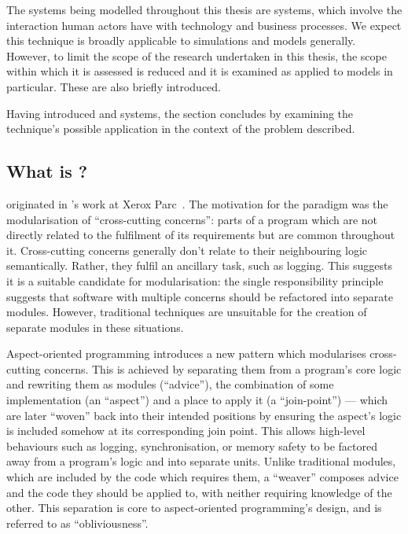 The systems being modelled throughout this thesis are \sociotechnical systems,
which involve the interaction human actors have with technology and business
processes. We expect this technique is broadly applicable to simulations and
models generally. However, to limit the scope of the research undertaken in this
thesis, the scope within which it is assessed is reduced and it is examined as
applied to \sociotechnical models in particular. These are also briefly
introduced.

Having introduced \aop{} and \sociotechnical systems, the
section concludes by examining the technique's possible application in the
context of the problem described.





\subsection{What is \AOP{}?}

\Aop{} originated in \citeauthor{kiczales1997aspect}'s work
at Xerox Parc~\cite{kiczales1997aspect}. The motivation for the paradigm was the
modularisation of ``cross-cutting concerns'': parts of a program which are not
directly related to the fulfilment of its requirements but are common throughout
it. Cross-cutting concerns generally don't relate to their neighbouring logic
semantically. Rather, they fulfil an ancillary task, such as logging. This
suggests it is a suitable candidate for modularisation: the single
responsibility principle~\cite{martin2003singleresponsibility} suggests that
software with multiple concerns should be refactored into separate modules.
However, traditional techniques are unsuitable for the creation of separate
modules in these situations.

Aspect-oriented programming introduces a new pattern which modularises
cross-cutting concerns. This is achieved by separating them from a program's
core logic and rewriting them as modules (``advice''), the combination of some
implementation (an ``aspect'') and a place to apply it (a ``join-point'')
 --- which are later ``woven'' back into their
intended positions by ensuring the aspect's logic is included somehow at its
corresponding join point. This allows high-level behaviours such as logging,
synchronisation, or memory safety to be factored away from a program's logic and
into separate units. Unlike traditional modules, which are included by the code
which requires them, a ``weaver'' composes advice and the code they should be
applied to, with neither requiring knowledge of the other. This separation is
core to aspect-oriented programming's design, and is referred to as
``obliviousness''.

